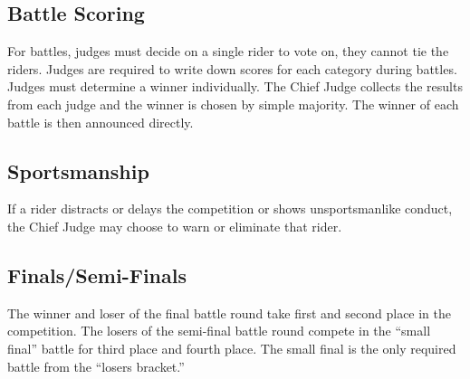 \subsection{Battle Scoring}
For battles, judges must decide on a single rider to vote on, they cannot tie the riders.
Judges are required to write down scores for each category during battles.
Judges must determine a winner individually.
The Chief Judge collects the results from each judge and the winner is chosen by simple majority.
The winner of each battle is then announced directly.

\subsection{Sportsmanship}
If a rider distracts or delays the competition or shows unsportsmanlike conduct, the Chief Judge may choose to warn or eliminate that rider.

\subsection{Finals/Semi-Finals}
The winner and loser of the final battle round take first and second place in the competition.
The losers of the semi-final battle round compete in the ``small final'' battle for third place and fourth place.
The small final is the only required battle from the ``losers bracket.''
